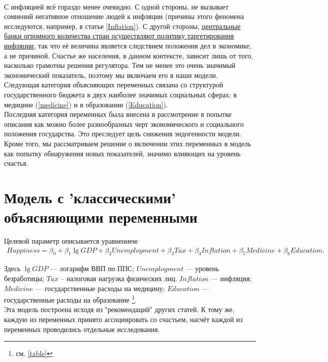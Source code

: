 \documentclass[russian]{vegareport}
\begin{document}
        \\
        С инфляцией всё гораздо менее очевидно. С одной стороны, не вызывает сомнений негативное отношение людей к инфляции (причины этого феномена исследуются, например, в статье \ref{Inflation}). С другой стороны, \href{http://www.centralbanknews.info/p/inflation-targets.html}{центральные банки огромного количества стран осуществляют политику таргетирования инфляции}, так что её величина является следствием положения дел в экономике, а не причиной. Счастье же населения, в данном контексте, зависит лишь от того, насколько грамотны решения регулятора. Тем не менее это очень значимый экономический показатель, поэтому мы включаем его в наши модели.
        \\
        Следующая категория объясняющих переменных связана со структурой государственного бюджета в двух наиболее значимых социальных сферах: в медицине (\ref{medicine}) и в образовании (\ref{Education}).
        \\
        Последняя категория переменных была внесена в рассмотрение в попытке описания как можно более разнообразных черт экономического и социального положения государства. Это преследует цель снижения эндогенности модели. Кроме того, мы рассматриваем решение о включении этих переменных в модель как попытку обнаружения новых показателей, значимо влияющих на уровень счастья.

        \section{Модель с 'классическими' объясняющими переменными}
        Целевой параметр описывается уравнением:
        \begin{align*}
        Happiness = \beta_0 + \beta_1 \lg{GDP} + \beta_2 Unemployment + \beta_3 Tax + \beta_4 Inflation + \beta_5 Medicine + \beta_6 Education.
        \end{align*}

        Здесь $\lg{GDP}$ --- логарифм ВВП по ППС; $Unemployment$ --- уровень безработицы; $Tax$ -- налоговая нагрузка физических лиц. $Inflation$ --- инфляция; $Medicine$ --- государственные расходы на медицину; $Education$ --- государственные расходы на образование \footnote{см. \ref{table}}.
        \\
        Эта модель построена исходя из "рекомендаций" других статей. К тому же, каждую из переменных принято ассоциировать со счастьем, насчёт каждой из переменных проводились отдельные исследования.
\end{document}

